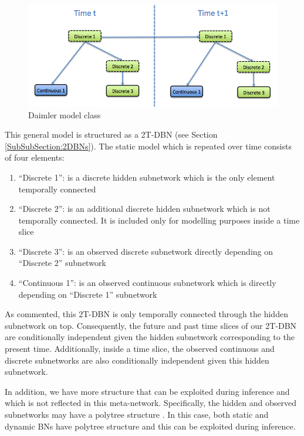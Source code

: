 \begin{figure}[ht!]
\begin{center}
\includegraphics[scale=0.4]{./figures/DaimlerModelClass}
\caption{\label{Figure:DaimlerModelClass} Daimler model class}
\end{center}
\end{figure}

This general model is structured as a 2T-DBN (see Section \ref{SubSubSection:2DBNs}). The static model which is repeated over time consists of four elements: 

\begin{enumerate}
\item ``Discrete 1'': is a discrete hidden subnetwork which is the only element temporally connected
\item ``Discrete 2'': is an additional discrete hidden subnetwork which is not temporally connected. It is included only for modelling purposes inside a time slice
\item ``Discrete 3'': is an observed discrete subnetwork directly depending on ``Discrete 2'' subnetwork
\item  ``Continuous 1'': is an observed continuous subnetwork which is directly depending on ``Discrete 1'' subnetwork
\end{enumerate}

As commented, this 2T-DBN is only temporally connected through the hidden subnetwork on top. Consequently, the future and past time slices of our 2T-DBN are conditionally independent given the hidden subnetwork corresponding to the present time. Additionally, inside a time slice, the observed continuous and discrete subnetworks are also conditionally independent given this hidden subnetwork.

In addition, we have more structure that can be exploited during inference and which is not reflected in this meta-network. Specifically, the hidden and observed subnetworks may have a polytree structure \cite{JensenNielsen2007}. In this case, both static and dynamic BNs have polytree structure and this can be exploited during inference. 

